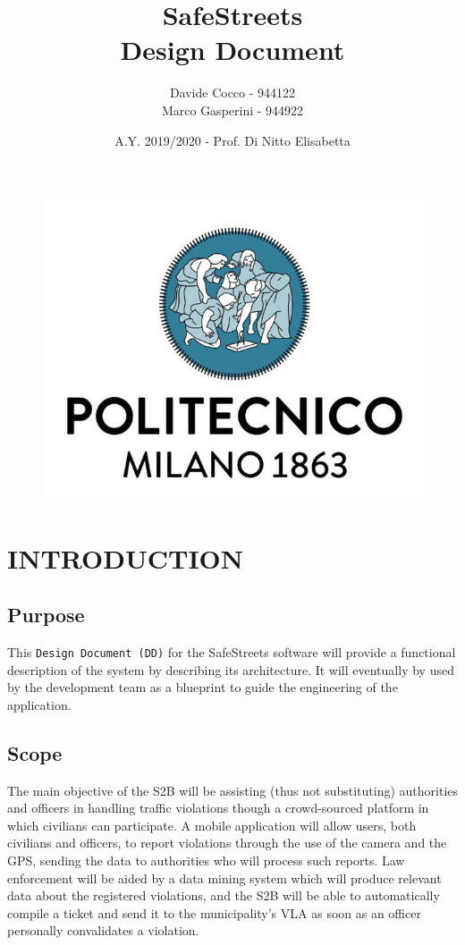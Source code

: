 \documentclass[12pt,a4paper]{article}
\author{Davide Cocco - 944122\\
	Marco Gasperini - 944922}
\date{A.Y. 2019/2020 - Prof. Di Nitto Elisabetta}
\title{
	\textbf{\Huge{SafeStreets}} \\
	\large Design Document
}
\begin{document}
	\begin{figure}
		\centering
		\includegraphics[width=1.0\linewidth]{Images/polimi.jpg}
	\end{figure}

	\maketitle
	\newpage
	\tableofcontents
	\newpage

\section{INTRODUCTION}
\subsection{Purpose}
This \texttt{Design Document (DD)} for the SafeStreets software will provide a functional description of the system by describing its architecture. 
It will eventually by used by the development team as a blueprint to guide the engineering of the application.
\subsection{Scope}
The main objective of the S2B will be assisting (thus not substituting) authorities and officers in handling traffic violations though a crowd-sourced platform in which civilians can participate. 
A mobile application will allow users, both civilians and officers, to report violations through the use of the camera and the GPS, sending the data to authorities who will process such reports. 
Law enforcement will be aided by a data mining system which will produce relevant data about the registered violations, and the S2B will be able to automatically compile a ticket and send it to
the municipality's VLA as soon as an officer personally convalidates a violation.
\end{document}
